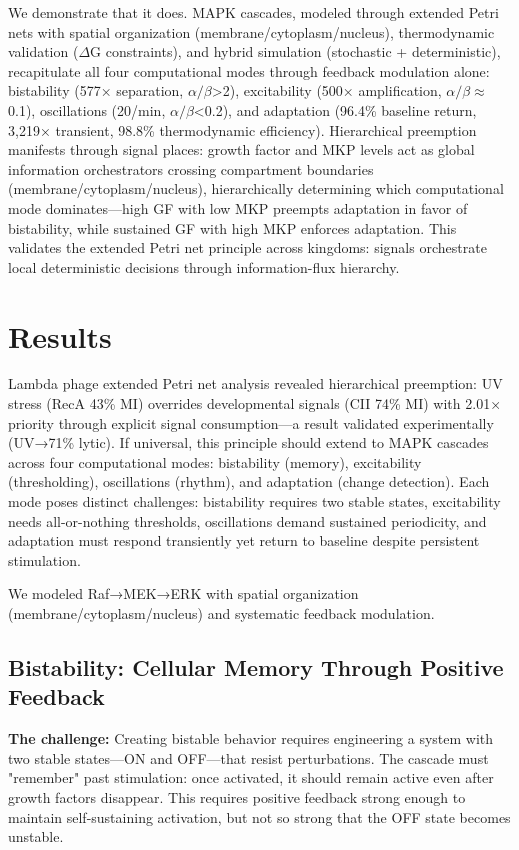 \documentclass[twocolumn,11pt]{article}
\begin{document}
We demonstrate that it does. MAPK cascades, modeled through extended Petri nets with spatial organization (membrane/cytoplasm/nucleus), thermodynamic validation ($\Delta$G constraints), and hybrid simulation (stochastic + deterministic), recapitulate all four computational modes through feedback modulation alone: bistability (577× separation, $\alpha/\beta$>2), excitability (500× amplification, $\alpha/\beta$$\approx$0.1), oscillations (20/min, $\alpha/\beta$<0.2), and adaptation (96.4\% baseline return, 3,219× transient, 98.8\% thermodynamic efficiency). Hierarchical preemption manifests through signal places: growth factor and MKP levels act as global information orchestrators crossing compartment boundaries (membrane/cytoplasm/nucleus), hierarchically determining which computational mode dominates—high GF with low MKP preempts adaptation in favor of bistability, while sustained GF with high MKP enforces adaptation. This validates the extended Petri net principle across kingdoms: signals orchestrate local deterministic decisions through information-flux hierarchy.

\section*{Results}

Lambda phage extended Petri net analysis revealed hierarchical preemption: UV stress (RecA 43\% MI) overrides developmental signals (CII 74\% MI) with 2.01× priority through explicit signal consumption—a result validated experimentally (UV→71\% lytic). If universal, this principle should extend to MAPK cascades across four computational modes: bistability (memory), excitability (thresholding), oscillations (rhythm), and adaptation (change detection). Each mode poses distinct challenges: bistability requires two stable states, excitability needs all-or-nothing thresholds, oscillations demand sustained periodicity, and adaptation must respond transiently yet return to baseline despite persistent stimulation.

We modeled Raf→MEK→ERK with spatial organization (membrane/cytoplasm/nucleus) and systematic feedback modulation.

\subsection*{Bistability: Cellular Memory Through Positive Feedback}

\textbf{The challenge:} Creating bistable behavior requires engineering a system with two stable states—ON and OFF—that resist perturbations. The cascade must "remember" past stimulation: once activated, it should remain active even after growth factors disappear. This requires positive feedback strong enough to maintain self-sustaining activation, but not so strong that the OFF state becomes unstable.
\end{document}
